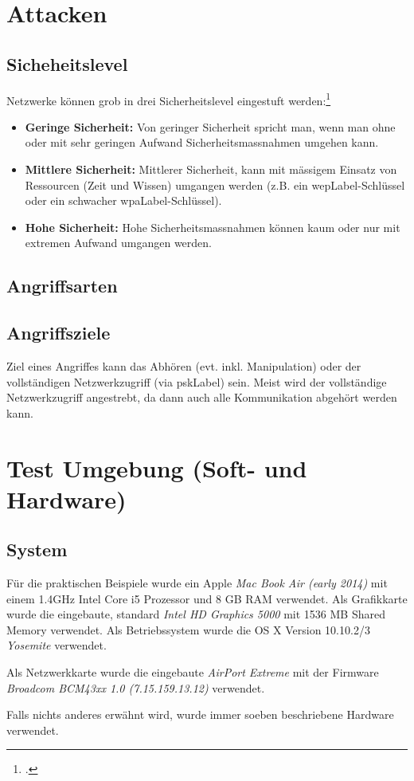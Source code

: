 \section{Attacken}

\subsection{Sicheheitslevel}
Netzwerke können grob in drei Sicherheitslevel eingestuft werden:\footcite[][115]{WrightCache201503}
\begin{itemize}
	\item \textbf{Geringe Sicherheit:} Von geringer Sicherheit spricht man, wenn man ohne oder mit sehr geringen Aufwand Sicherheitsmassnahmen umgehen kann.
	\item \textbf{Mittlere Sicherheit:} Mittlerer Sicherheit, kann mit mässigem Einsatz von Ressourcen (Zeit und Wissen) umgangen werden (z.B. ein \gls{wepLabel}-Schlüssel oder ein schwacher \gls{wpaLabel}-Schlüssel).
	\item \textbf{Hohe Sicherheit:} Hohe Sicherheitsmassnahmen können kaum oder nur mit extremen Aufwand umgangen werden.
\end{itemize}

\subsection{Angriffsarten}

\subsection{Angriffsziele}
Ziel eines Angriffes kann das Abhören (evt. inkl. Manipulation) oder der vollständigen Netzwerkzugriff (via \gls{pskLabel}) sein.
Meist wird der vollständige Netzwerkzugriff angestrebt, da dann auch alle Kommunikation abgehört werden kann.

\section{Test Umgebung (Soft- und Hardware)}
\label{sec:testEnvroiment}
\subsection{System}
Für die praktischen Beispiele wurde ein Apple \textit{Mac Book Air (early 2014)} mit einem 1.4GHz Intel Core i5 Prozessor und 8 GB RAM verwendet. Als Grafikkarte wurde die eingebaute, standard \textit{Intel HD Graphics 5000} mit 1536 MB Shared Memory verwendet.
Als Betriebssystem wurde die OS X Version 10.10.2/3 \textit{Yosemite} verwendet.

Als Netzwerkkarte wurde die eingebaute \textit{AirPort Extreme} mit der Firmware \textit{Broadcom BCM43xx 1.0 (7.15.159.13.12)} verwendet.

Falls nichts anderes erwähnt wird, wurde immer soeben beschriebene Hardware verwendet.
